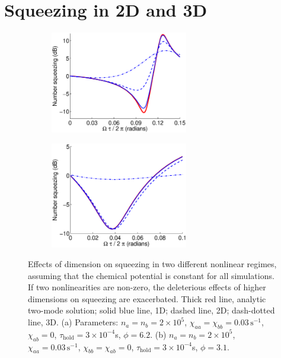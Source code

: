 \documentclass{iopart}
\begin{document}
\section{Squeezing in 2D and 3D} \label{sec:2D3Dsqueezing}

\begin{figure}
  \centering
  \begin{subfigure}{.5\textwidth}
    \centering
    \includegraphics[width=6cm]{figures/dimensional_effects_on_squeezing_1.eps}
    \label{figDimensionalSqueezingEffects:sub1}
  \end{subfigure}%
  \begin{subfigure}{.5\textwidth}
    \centering
    \includegraphics[width=6cm]{figures/dimensional_effects_on_squeezing_2.eps}
    \label{figDimensionalSqueezingEffects:sub2}
  \end{subfigure}
\caption{Effects of dimension on squeezing in two different nonlinear regimes, assuming that the chemical potential is constant for all simulations. If two nonlinearities are non-zero, the deleterious effects of higher dimensions on squeezing are exacerbated. Thick red line, analytic two-mode solution; solid blue line, 1D; dashed line, 2D; dash-dotted line, 3D. (a) Parameters: $n_a = n_b =2 \times 10^5$, $\chi_{aa}=\chi_{bb}=0.03\,\text{s}^{-1}$, $\chi_{ab}=0$, $\tau_{\mathrm{hold}}=3\times 10^{-4}$s, $\phi=6.2$. (b) $n_a = n_b =2 \times 10^5$, $\chi_{aa}=0.03\,\text{s}^{-1}$, $\chi_{bb}=\chi_{ab}=0$, $\tau_{\mathrm{hold}}=3\times 10^{-4}$s, $\phi=3.1$.}
  \label{figDimensionalSqueezingEffects}
\end{figure}
\end{document}
